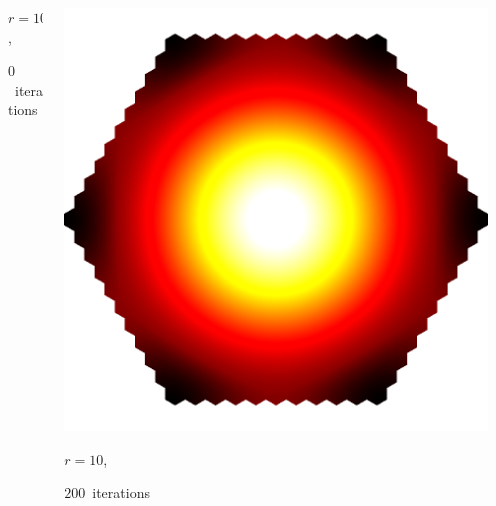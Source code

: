 \documentclass[aspectratio=169,t]{beamer}
\begin{document}
{\begin{columns}
\begin{column}{0.22\textwidth}
			{\footnotesize
				\par \vspace{-1mm} $r=10$,
				\par \vspace{-1mm} $0$~iterations
			}
		\end{column}
		\begin{column}{0.22\textwidth}
			\centering
			\includegraphics[width=.85\textwidth]{data/synthetic_meshes/hexagonal_tessellation_Dirac_delta_10_v1057_f1986_funcvals_200iter_crop.png}
			{\footnotesize
				\par \vspace{-1mm} $r=10$,
				\par \vspace{-1mm} $200$~iterations
			}
		\end{column}
		\begin{column}{0.17\textwidth}~\end{column}
	\end{columns}
}
\end{document}
